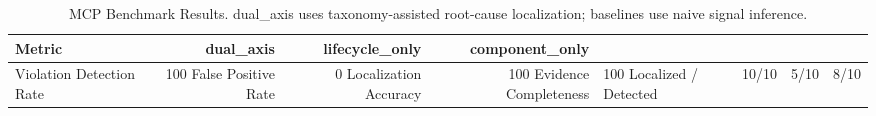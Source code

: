 \begin{table}[h]
\centering
\begin{tabular}{lrrr}
\hline
Metric & dual\_axis & lifecycle\_only & component\_only \\
\hline
Violation Detection Rate & 100%
False Positive Rate & 0%
Localization Accuracy & 100%
Evidence Completeness & 100%
Localized / Detected & 10/10 & 5/10 & 8/10 \\
\hline
\end{tabular}
\caption{MCP Benchmark Results. dual\_axis uses taxonomy-assisted root-cause localization; baselines use naive signal inference.}
\label{tab:benchmark}
\end{table}